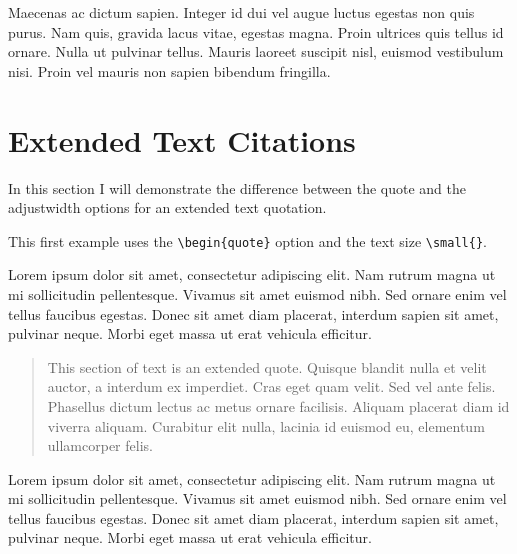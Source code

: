  Maecenas ac dictum sapien. Integer id dui vel augue luctus egestas non quis purus. Nam quis, gravida lacus vitae, egestas magna. Proin ultrices quis tellus id ornare. Nulla ut pulvinar tellus. Mauris laoreet suscipit nisl, euismod vestibulum nisi. Proin vel mauris non sapien bibendum fringilla. \parencite[see][]{Han2015WhyRevolution}



\section{Extended Text Citations}

In this section I will demonstrate the difference between the quote and the adjustwidth options for an extended text quotation. 

\vspace{0.4cm}

This first example uses the \verb|\begin{quote}| option and the text size \verb|\small{}|. 

\vspace{0.4cm}

Lorem ipsum dolor sit amet, consectetur adipiscing elit. Nam rutrum magna ut mi sollicitudin pellentesque. Vivamus sit amet euismod nibh. Sed ornare enim vel tellus faucibus egestas. Donec sit amet diam placerat, interdum sapien sit amet, pulvinar neque. Morbi eget massa ut erat vehicula efficitur. 

\begin{quote}

\small{This section of text is an extended quote. Quisque blandit nulla et velit auctor, a interdum ex imperdiet. Cras eget quam velit. Sed vel ante felis. Phasellus dictum lectus ac metus ornare facilisis. Aliquam placerat diam id viverra aliquam. Curabitur elit nulla, lacinia id euismod eu, elementum ullamcorper felis.} \parencite[][p. 100]{sennett1998corrosion}

\end{quote}

Lorem ipsum dolor sit amet, consectetur adipiscing elit. Nam rutrum magna ut mi sollicitudin pellentesque. Vivamus sit amet euismod nibh. Sed ornare enim vel tellus faucibus egestas. Donec sit amet diam placerat, interdum sapien sit amet, pulvinar neque. Morbi eget massa ut erat vehicula efficitur. 

